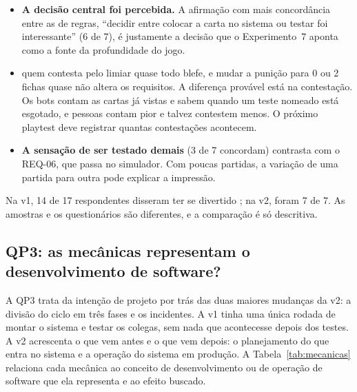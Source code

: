 \begin{itemize}
  \item \textbf{A decisão central foi percebida.} A afirmação com mais concordância entre as de regras, ``decidir
    entre colocar a carta no sistema ou testar foi interessante'' (6 de 7), é justamente a decisão que o
    Experimento~7 aponta como a fonte da profundidade do jogo.
  \item {} quem contesta pelo limiar  quase todo blefe, e mudar a punição para 0 ou 2 fichas quase não
    altera os requisitos. A diferença provável está na contestação. Os bots contam as cartas já vistas e sabem
    quando um teste nomeado está esgotado, e pessoas contam pior e talvez contestem menos. O próximo playtest deve
    registrar quantas contestações acontecem.
  \item \textbf{A sensação de ser testado demais} (3 de 7 concordam) contrasta com o REQ-06, que passa no
    simulador. Com poucas partidas, a variação de uma partida para outra pode explicar a impressão.
\end{itemize}

Na v1, 14 de 17 respondentes disseram ter se divertido \cite{oliveira2025critical}; na v2, foram 7 de 7. As amostras e os questionários são diferentes, e a comparação é só descritiva.

\subsection{QP3: as mecânicas representam o desenvolvimento de software?}
\label{sec:qp3}

A QP3 trata da intenção de projeto por trás das duas maiores mudanças da v2: a divisão do ciclo em três fases e
os incidentes. A v1 tinha uma única rodada de montar o sistema e testar os colegas, sem nada que acontecesse
depois dos testes. A v2 acrescenta o que vem antes e o que vem depois: o planejamento do que entra no sistema e a
operação do sistema em produção. A Tabela~\ref{tab:mecanicas} relaciona cada mecânica ao conceito de
desenvolvimento ou de operação de software que ela representa e ao efeito buscado.

